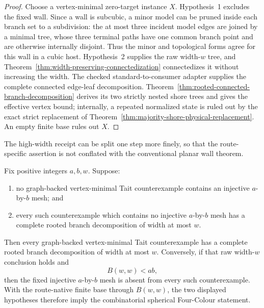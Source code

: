 \begin{proof}
Choose a vertex-minimal zero-target instance \(X\).  Hypothesis~1 excludes
the fixed wall.  Since a wall is subcubic, a minor model can be pruned inside
each branch set to a subdivision: the at most three incident model edges are
joined by a minimal tree, whose three terminal paths have one common branch
point and are otherwise internally disjoint.  Thus the minor and topological
forms agree for this wall in a cubic host.  Hypothesis~2 supplies the raw
width-$w$ tree, and Theorem~\ref{thm:width-preserving-connectedization}
connectedizes it without increasing the width.  The checked
standard-to-consumer adapter supplies the complete connected edge-leaf
decomposition.  Theorem~\ref{thm:rooted-connected-branch-decomposition}
derives its two strictly nested shore trees and gives the effective vertex
bound; internally, a repeated normalized state is ruled out by the exact
strict replacement of Theorem~\ref{thm:majority-shore-physical-replacement}.
An empty finite base rules out \(X\).
\end{proof}

The high-width receipt can be split one step more finely, so that the
route-specific assertion is not conflated with the conventional planar wall
theorem.

\begin{proposition}
\label{prop:fixed-mesh-width-factorization}
Fix positive integers $a,b,w$.  Suppose:
\begin{enumerate}
\item no graph-backed vertex-minimal Tait counterexample contains an
injective $a$-by-$b$ mesh; and
\item every such counterexample which contains no injective
$a$-by-$b$ mesh has a complete rooted branch decomposition of width at
most $w$.
\end{enumerate}
Then every graph-backed vertex-minimal Tait counterexample has a complete
rooted branch decomposition of width at most $w$.  Conversely, if that raw
width-$w$ conclusion holds and
\[
  B(w,w)<ab,
\]
then the fixed injective $a$-by-$b$ mesh is absent from every such
counterexample.
With the route-native finite base through $B(w,w)$, the two displayed
hypotheses therefore imply the combinatorial spherical Four-Colour
statement.
\end{proposition}

